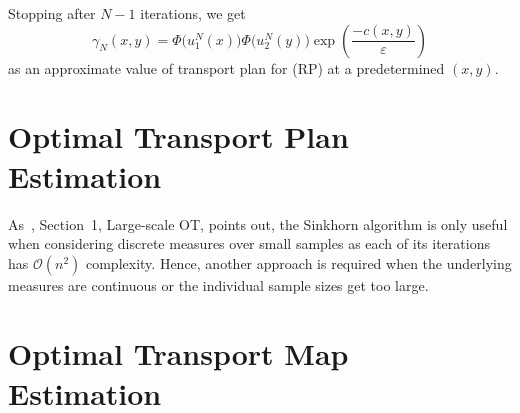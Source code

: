 Stopping after $N - 1$ iterations, we get
\[ \gamma_N(x, y) = \Phi\big( u_1^N(x) \big) \Phi\big( u_2^N(y) \big) \exp\left( \frac{- c(x, y)}{\varepsilon} \right) \]
as an approximate value of transport plan for (RP) at a predetermined $(x, y)$.

\section{Optimal Transport Plan Estimation}\label{OTPlanEst}

As~\cite{Seg2018}, Section~1, Large-scale OT, points out, the Sinkhorn algorithm is only useful when considering discrete measures over small samples as each of its iterations has $\mathcal{O}(n^2)$ complexity. Hence, another approach is required when the underlying measures are continuous or the individual sample sizes get too large.


\section{Optimal Transport Map Estimation}\label{OTMapEst}

